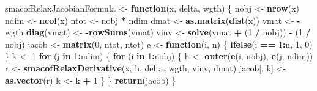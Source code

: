 \documentclass[
  12pt,
]{article}
\newenvironment{Shaded}{\begin{snugshade}}{\end{snugshade}}
\newcommand{\ControlFlowTok}[1]{\textcolor[rgb]{0.13,0.29,0.53}{\textbf{#1}}}
\newcommand{\DecValTok}[1]{\textcolor[rgb]{0.00,0.00,0.81}{#1}}
\newcommand{\FunctionTok}[1]{\textcolor[rgb]{0.13,0.29,0.53}{\textbf{#1}}}
\newcommand{\NormalTok}[1]{#1}
\newcommand{\OtherTok}[1]{\textcolor[rgb]{0.56,0.35,0.01}{#1}}
\newcommand{\SpecialCharTok}[1]{\textcolor[rgb]{0.81,0.36,0.00}{\textbf{#1}}}
\begin{document}
\begin{Shaded}
\begin{Highlighting}[]
\NormalTok{smacofRelaxJacobianFormula }\OtherTok{\textless{}{-}} \ControlFlowTok{function}\NormalTok{(x, delta, wgth) \{}
\NormalTok{  nobj }\OtherTok{\textless{}{-}} \FunctionTok{nrow}\NormalTok{(x)}
\NormalTok{  ndim }\OtherTok{\textless{}{-}} \FunctionTok{ncol}\NormalTok{(x)}
\NormalTok{  ntot }\OtherTok{\textless{}{-}}\NormalTok{ nobj }\SpecialCharTok{*}\NormalTok{ ndim}
\NormalTok{  dmat }\OtherTok{\textless{}{-}} \FunctionTok{as.matrix}\NormalTok{(}\FunctionTok{dist}\NormalTok{(x))}
\NormalTok{  vmat }\OtherTok{\textless{}{-}} \SpecialCharTok{{-}}\NormalTok{wgth}
  \FunctionTok{diag}\NormalTok{(vmat) }\OtherTok{\textless{}{-}} \SpecialCharTok{{-}}\FunctionTok{rowSums}\NormalTok{(vmat)}
\NormalTok{  vinv }\OtherTok{\textless{}{-}} \FunctionTok{solve}\NormalTok{(vmat }\SpecialCharTok{+}\NormalTok{ (}\DecValTok{1} \SpecialCharTok{/}\NormalTok{ nobj)) }\SpecialCharTok{{-}}\NormalTok{ (}\DecValTok{1} \SpecialCharTok{/}\NormalTok{ nobj)}
\NormalTok{  jacob }\OtherTok{\textless{}{-}} \FunctionTok{matrix}\NormalTok{(}\DecValTok{0}\NormalTok{, ntot, ntot)}
\NormalTok{  e }\OtherTok{\textless{}{-}} \ControlFlowTok{function}\NormalTok{(i, n) \{}
    \FunctionTok{ifelse}\NormalTok{(i }\SpecialCharTok{==} \DecValTok{1}\SpecialCharTok{:}\NormalTok{n, }\DecValTok{1}\NormalTok{, }\DecValTok{0}\NormalTok{)}
\NormalTok{  \}}
\NormalTok{  k }\OtherTok{\textless{}{-}} \DecValTok{1}
  \ControlFlowTok{for}\NormalTok{ (j }\ControlFlowTok{in} \DecValTok{1}\SpecialCharTok{:}\NormalTok{ndim) \{}
    \ControlFlowTok{for}\NormalTok{ (i }\ControlFlowTok{in} \DecValTok{1}\SpecialCharTok{:}\NormalTok{nobj) \{}
\NormalTok{      h }\OtherTok{\textless{}{-}} \FunctionTok{outer}\NormalTok{(}\FunctionTok{e}\NormalTok{(i, nobj), }\FunctionTok{e}\NormalTok{(j, ndim))}
\NormalTok{      r }\OtherTok{\textless{}{-}} \FunctionTok{smacofRelaxDerivative}\NormalTok{(x, h, delta, wgth, vinv, dmat)}
\NormalTok{      jacob[, k] }\OtherTok{\textless{}{-}} \FunctionTok{as.vector}\NormalTok{(r)}
\NormalTok{      k }\OtherTok{\textless{}{-}}\NormalTok{ k }\SpecialCharTok{+} \DecValTok{1}
\NormalTok{    \}}
\NormalTok{  \}}
  \FunctionTok{return}\NormalTok{(jacob)}
\NormalTok{\}}


\end{Highlighting}
\end{Shaded}
\end{document}
